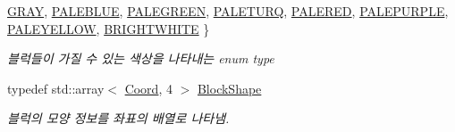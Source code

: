 \begin{DoxyCompactItemize}
\mbox{\hyperlink{class_block_ad054b4ac51df79aa910040b2a2fdf7b5a1158efe2e537f0b96f9ea590f22ab821}{G\+R\+AY}}, 
\mbox{\hyperlink{class_block_ad054b4ac51df79aa910040b2a2fdf7b5aad861330fd0e7f87dbfbe9ceb49785b3}{P\+A\+L\+E\+B\+L\+UE}}, 
\mbox{\hyperlink{class_block_ad054b4ac51df79aa910040b2a2fdf7b5ad7542730815e74f4f9a9df7fec33d3b5}{P\+A\+L\+E\+G\+R\+E\+EN}}, 
\mbox{\hyperlink{class_block_ad054b4ac51df79aa910040b2a2fdf7b5acbe4a64f95830b01b5be63b91544d452}{P\+A\+L\+E\+T\+U\+RQ}}, 
\newline
\mbox{\hyperlink{class_block_ad054b4ac51df79aa910040b2a2fdf7b5a9a1a56423a8c5b1b51fb11d184ced4cd}{P\+A\+L\+E\+R\+ED}}, 
\mbox{\hyperlink{class_block_ad054b4ac51df79aa910040b2a2fdf7b5ae78300d2e1540cc8a58c4018a2b902a6}{P\+A\+L\+E\+P\+U\+R\+P\+LE}}, 
\mbox{\hyperlink{class_block_ad054b4ac51df79aa910040b2a2fdf7b5ac09cccdee282b3a0c1331e2892042bea}{P\+A\+L\+E\+Y\+E\+L\+L\+OW}}, 
\mbox{\hyperlink{class_block_ad054b4ac51df79aa910040b2a2fdf7b5af606ae67cebcef81e9ee80f1411d4247}{B\+R\+I\+G\+H\+T\+W\+H\+I\+TE}}
 \}
\begin{DoxyCompactList}\small\item\em 블럭들이 가질 수 있는 색상을 나타내는 enum type \end{DoxyCompactList}\item 
typedef std\+::array$<$ \mbox{\hyperlink{struct_coord}{Coord}}, 4 $>$ \mbox{\hyperlink{class_block_aca5d951639f113e2ebd7856209d6b9ab}{Block\+Shape}}
\begin{DoxyCompactList}\small\item\em 블럭의 모양 정보를 좌표의 배열로 나타냄. \end{DoxyCompactList}\end{DoxyCompactItemize}
